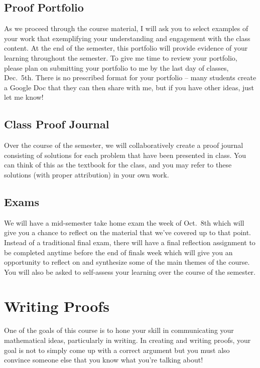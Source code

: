 \documentclass[
  letterpaper,
  DIV=11,
  numbers=noendperiod]{scrreprt}
\begin{document}
\section{Proof Portfolio}\label{proof-portfolio}

As we proceed through the course material, I will ask you to select
examples of your work that exemplifying your understanding and
engagement with the class content. At the end of the semester, this
portfolio will provide evidence of your learning throughout the
semester. To give me time to review your portfolio, please plan on
submitting your portfolio to me by the last day of classes, Dec.~5th.
There is no prescribed format for your portfolio -- many students create
a Google Doc that they can then share with me, but if you have other
ideas, just let me know!

\section{Class Proof Journal}\label{class-proof-journal}

Over the course of the semester, we will collaboratively create a proof
journal consisting of solutions for each problem that have been
presented in class. You can think of this as the textbook for the class,
and you may refer to these solutions (with proper attribution) in your
own work.

\section{Exams}\label{exams}

We will have a mid-semester take home exam the week of Oct.~8th which
will give you a chance to reflect on the material that we've covered up
to that point. Instead of a traditional final exam, there will have a
final reflection assignment to be completed anytime before the end of
finals week which will give you an opportunity to reflect on and
synthesize some of the main themes of the course. You will also be asked
to self-assess your learning over the course of the semester.


\chapter{Writing Proofs}\label{writing-proofs}

One of the goals of this course is to hone your skill in communicating
your mathematical ideas, particularly in writing. In creating and
writing proofs, your goal is not to simply come up with a correct
argument but you must also convince someone else that you know what
you're talking about!
\end{document}
